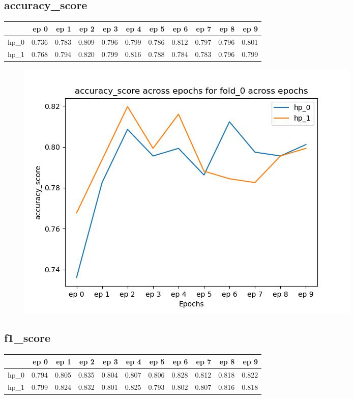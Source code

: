 \documentclass{article}
\begin{document}
\subsection{accuracy\_score}
\begin{tabular}{lrrrrrrrrrr}
\toprule
{} &   ep 0 &   ep 1 &   ep 2 &   ep 3 &   ep 4 &   ep 5 &   ep 6 &   ep 7 &   ep 8 &   ep 9 \\
\midrule
hp\_0 &  0.736 &  0.783 &  0.809 &  0.796 &  0.799 &  0.786 &  0.812 &  0.797 &  0.796 &  0.801 \\
hp\_1 &  0.768 &  0.794 &  0.820 &  0.799 &  0.816 &  0.788 &  0.784 &  0.783 &  0.796 &  0.799 \\
\bottomrule
\end{tabular}

\begin{figure}[H]
\includegraphics[scale = 0.75]{fold_0/accuracy_score}
\end{figure}
\subsection{f1\_score}
\begin{tabular}{lrrrrrrrrrr}
\toprule
{} &   ep 0 &   ep 1 &   ep 2 &   ep 3 &   ep 4 &   ep 5 &   ep 6 &   ep 7 &   ep 8 &   ep 9 \\
\midrule
hp\_0 &  0.794 &  0.805 &  0.835 &  0.804 &  0.807 &  0.806 &  0.828 &  0.812 &  0.818 &  0.822 \\
hp\_1 &  0.799 &  0.824 &  0.832 &  0.801 &  0.825 &  0.793 &  0.802 &  0.807 &  0.816 &  0.818 \\
\bottomrule
\end{tabular}
\end{document}
